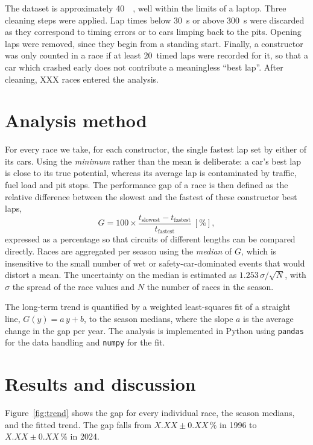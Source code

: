 \documentclass[11pt,a4paper]{article}
\newcommand{\nRaces}{XXX}              %
\newcommand{\firstYear}{1996}
\newcommand{\lastYear}{2024}
\newcommand{\gapFirst}{X.XX}           %
\newcommand{\gapFirstErr}{0.XX}
\newcommand{\gapLast}{X.XX}            %
\newcommand{\gapLastErr}{0.XX}
\begin{document}
The dataset is approximately \SI{40}{\mega\byte}, well within the limits of a
laptop. Three cleaning steps were applied. Lap times below \SI{30}{\second} or
above \SI{300}{\second} were discarded as they correspond to timing errors or to
cars limping back to the pits. Opening laps were removed, since they begin from a
standing start. Finally, a constructor was only counted in a race if at least
20~timed laps were recorded for it, so that a car which crashed early does not
contribute a meaningless ``best lap''. After cleaning, \nRaces{} races entered
the analysis.

\section{Analysis method}
For every race we take, for each constructor, the single fastest lap set by
either of its cars. Using the \emph{minimum} rather than the mean is deliberate:
a car's best lap is close to its true potential, whereas its average lap is
contaminated by traffic, fuel load and pit stops. The performance gap of a race
is then defined as the relative difference between the slowest and the fastest of
these constructor best laps,
%
\begin{equation}
  G = 100 \times \frac{t_{\text{slowest}} - t_{\text{fastest}}}{t_{\text{fastest}}}\ [\%],
\end{equation}
%
expressed as a percentage so that circuits of different lengths can be compared
directly. Races are aggregated per season using the \emph{median} of $G$, which
is insensitive to the small number of wet or safety-car-dominated events that
would distort a mean. The uncertainty on the median is estimated as
$1.253\,\sigma/\sqrt{N}$, with $\sigma$ the spread of the race values and $N$ the
number of races in the season.

The long-term trend is quantified by a weighted least-squares fit of a straight
line, $G(y) = a\,y + b$, to the season medians, where the slope $a$ is the
average change in the gap per year. The analysis is implemented in Python using
\texttt{pandas} for the data handling and \texttt{numpy} for the fit.

\section{Results and discussion}
Figure~\ref{fig:trend} shows the gap for every individual race, the season
medians, and the fitted trend. The gap falls from
$\gapFirst \pm \gapFirstErr\,\%$ in \firstYear{} to
$\gapLast \pm \gapLastErr\,\%$ in \lastYear.
\end{document}
